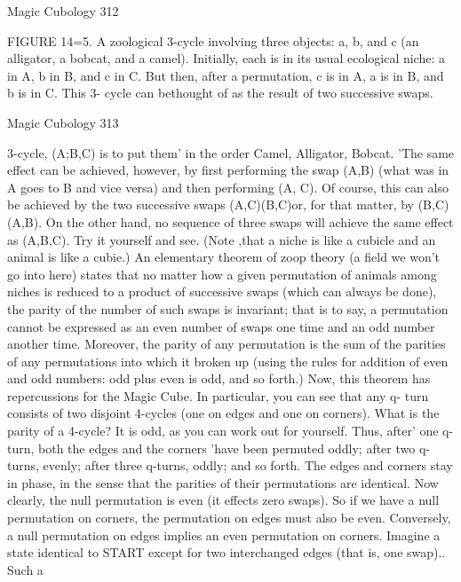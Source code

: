 Magic Cubology                                                                        312

FIGURE 14=5. A zoological 3-cycle involving three objects: a, b, and c (an alligator,
a bobcat, and a camel). Initially, each is in its usual ecological niche: a in A, b in B,
and c in C. But then, after a permutation, c is in A, a is in B, and b is in C. This 3-
cycle can bethought of as the result of two successive swaps.




Magic Cubology                                                                       313

3-cycle, (A;B,C) is to put them' in the order Camel, Alligator, Bobcat. 'The same
effect can be achieved, however, by first performing the swap (A,B) (what was in A
goes to B and vice versa) and then performing (A, C). Of course, this can also be
achieved by the two successive swaps (A,C)(B,C)or, for that matter, by (B,C)(A,B).
On the other hand, no sequence of three swaps will achieve the same effect as
(A,B,C). Try it yourself and see. (Note ,that a niche is like a cubicle and an animal is
like a cubie.)
        An elementary theorem of zoop theory (a field we won't go into here) states
that no matter how a given permutation of animals among niches is reduced to a
product of successive swaps (which can always be done), the parity of the number of
such swaps is invariant; that is to say, a permutation cannot be expressed as an even
number of swaps one time and an odd number another time. Moreover, the parity of
any permutation is the sum of the parities of any permutations into which it broken up
(using the rules for addition of even and odd numbers: odd plus even is odd, and so
forth.)
        Now, this theorem has repercussions for the Magic Cube. In particular, you
can see that any q- turn consists of two disjoint 4-cycles (one on edges and one on
corners). What is the parity of a 4-cycle? It is odd, as you can work out for yourself.
Thus, after' one q- turn, both the edges and the corners 'have been permuted oddly;
after two q- turns, evenly; after three q-turns, oddly; and so forth. The edges and
corners stay in phase, in the sense that the parities of their permutations are identical.
Now clearly, the null permutation is even (it effects zero swaps). So if we have a null
permutation on corners, the permutation on edges must also be even. Conversely, a
null permutation on edges implies an even permutation on corners. Imagine a state
identical to START except for two interchanged edges (that is, one swap).. Such a
